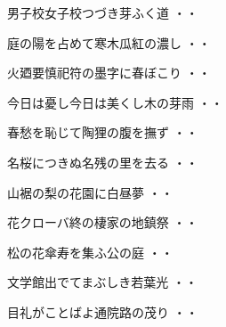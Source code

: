 \vspace{0.6cm}
\begin{shiika}男子校女子校つづき芽ふく道
\hfill{・・}\end{shiika}
\vspace{0.6cm}
\begin{shiika}庭の陽を占めて寒木瓜紅の濃し
\hfill{・・}\end{shiika}
\vspace{0.6cm}
\begin{shiika}火廼要慎祀符の墨字に春ぼこり
\hfill{・・}\end{shiika}
\vspace{0.6cm}
\begin{shiika}今日は憂し今日は美くし木の芽雨
\hfill{・・}\end{shiika}
\vspace{0.6cm}
\begin{shiika}春愁を恥じて陶狸の腹を撫ず
\hfill{・・}\end{shiika}
\vspace{0.6cm}
\begin{shiika}名桜につきぬ名残の里を去る
\hfill{・・}\end{shiika}
\vspace{0.6cm}
\begin{shiika}山裾の梨の花園に白昼夢
\hfill{・・}\end{shiika}
\vspace{0.6cm}
\begin{shiika}花クローバ終の棲家の地鎮祭
\hfill{・・}\end{shiika}
\vspace{0.6cm}
\begin{shiika}松の花傘寿を集ふ公の庭
\hfill{・・}\end{shiika}
\vspace{0.6cm}
\begin{shiika}文学館出でてまぶしき若葉光
\hfill{・・}\end{shiika}
\vspace{0.6cm}
\begin{shiika}目礼がことばよ通院路の茂り
\hfill{・・}\end{shiika}
